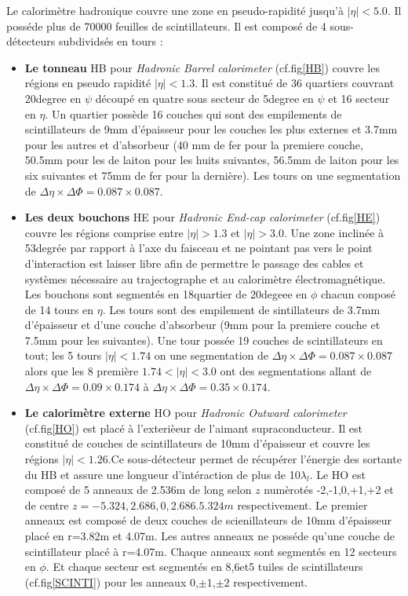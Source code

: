 Le calorimètre hadronique couvre une zone en pseudo-rapidité jusqu'à $|\eta|<5.0$. Il posséde plus de 70000 feuilles de scintillateurs. Il est composé de 4 sous-détecteurs subdividsés en tours : 
\begin{itemize}[label=$\bullet$]
	\item \textbf{Le tonneau} HB pour \textit{Hadronic Barrel calorimeter} (cf.fig\ref{HB}) couvre les régions en pseudo rapidité $|\eta|<1.3$. Il est constitué de 36 quartiers couvrant 20degree en $\psi$ découpé en quatre sous secteur de 5degree en $\psi$ et 16 secteur en $\eta$. Un quartier possède 16 couches qui sont des empilements de scintillateurs de 9mm d'épaisseur pour les couches les plus externes et 3.7mm pour les autres et d'absorbeur (40 mm de fer pour la premiere couche, 50.5mm pour les de laiton pour les huits suivantes, 56.5mm de laiton pour les six suivantes et 75mm de fer pour la dernière). Les tours on une segmentation de $\Delta\eta\times\Delta\Phi=0.087\times0.087$.
	\item \textbf{Les deux bouchons} HE pour \textit{Hadronic End-cap calorimeter} (cf.fig\ref{HE}) couvre les régions comprise entre $|\eta|>1.3$ et $|\eta|>3.0$. Une zone inclinée à 53degrée par rapport à l'axe du faisceau et ne pointant pas vers le point d'interaction est laisser libre afin de permettre le passage des cables et systèmes nécessaire au trajectographe et au calorimètre électromagnétique. Les bouchons sont segmentés en 18quartier de 20degeee en $\phi$ chacun conposé de 14 tours en $\eta$. Les tours sont des empilement de sintillateurs de 3.7mm d'épaisseur et d'une couche d'absorbeur (9mm pour la premiere couche et 7.5mm pour les suivantes). Une tour possée 19 couches de  scintillateurs en tout; les 5 tours $|\eta|<1.74$ on une segmentation de $\Delta\eta\times\Delta\Phi=0.087\times0.087$ alors que les 8 première $1.74<|\eta|<3.0$ ont des segmentations allant de $\Delta\eta\times\Delta\Phi=0.09\times0.174$ à $\Delta\eta\times\Delta\Phi=0.35\times0.174$.
	\item \textbf{Le calorimètre externe }HO pour \textit{Hadronic Outward calorimeter} (cf.fig\ref{HO}) est placé à l'exterièeur de l'aimant supraconducteur. Il est constitué de couches de scintillateurs de 10mm d'épaisseur et couvre les régions $|\eta|<1.26$.Ce sous-détecteur permet de récupérer l'énergie des sortante du HB et assure une longueur d'intéraction de plus de 10$\lambda_{l}$. Le HO est composé de 5 anneaux de 2.536m de long selon $z$ 
	numèrotés -2,-1,0,+1,+2 et de centre $z=-5.324,2.686,0,2.686.5.324m$ respectivement. Le premier anneaux est composé de deux couches de scienillateurs de 10mm d'épaisseur  placé en r=3.82m et 4.07m. Les autres anneaux ne posséde qu'une couche de scintillateur placé à r=4.07m. Chaque anneaux sont segmentés en 12 secteurs en $\phi$. Et chaque secteur est segmentés en 8,6et5 tuiles de scintillateurs (cf.fig\ref{SCINTI}) pour les anneaux 0,$\pm1$,$\pm2$ respectivement.

\end{itemize}
